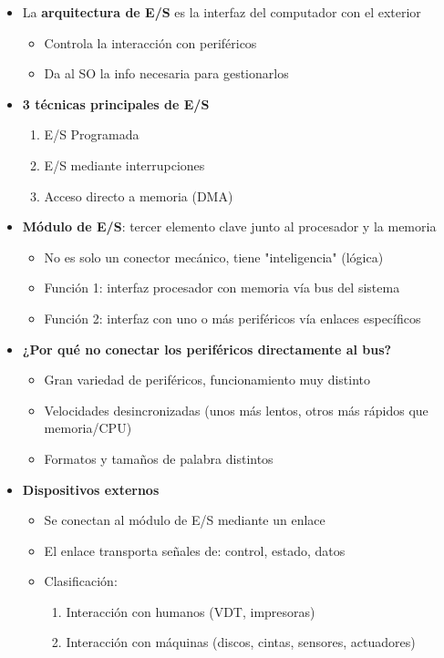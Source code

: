 \documentclass{article}
\begin{document}
\begin{itemize}
\item La \textbf{arquitectura de E/S} es la interfaz del computador con el exterior
\begin{itemize}
\item Controla la interacción con periféricos
\item Da al SO la info necesaria para gestionarlos
\end{itemize}
\item \textbf{3 técnicas principales de E/S}
\begin{enumerate}
\item E/S Programada
\item E/S mediante interrupciones
\item Acceso directo a memoria (DMA)
\end{enumerate}
\item \textbf{Módulo de E/S}: tercer elemento clave junto al procesador y la memoria
\begin{itemize}
\item No es solo un conector mecánico, tiene "inteligencia" (lógica)
\item Función 1: interfaz procesador con  memoria vía bus del sistema
\item Función 2: interfaz con uno o más periféricos vía enlaces específicos
\end{itemize}
\item \textbf{¿Por qué no conectar los periféricos directamente al bus?}
\begin{itemize}
\item Gran variedad de periféricos, funcionamiento muy distinto
\item Velocidades desincronizadas (unos más lentos, otros más rápidos que memoria/CPU)
\item Formatos y tamaños de palabra distintos
\end{itemize}
\item \textbf{Dispositivos externos}
\begin{itemize}
\item Se conectan al módulo de E/S mediante un enlace
\item El enlace transporta señales de: control, estado, datos
\item Clasificación:
\begin{enumerate}
\item Interacción con humanos (VDT, impresoras)
\item Interacción con máquinas (discos, cintas, sensores, actuadores)

\end{enumerate}
\end{itemize}
\end{itemize}
\end{document}
